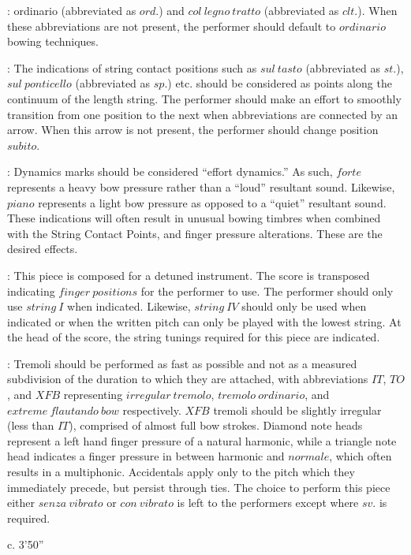 \documentclass[11pt]{article}
\newcommand*\circled[1]{\tikz[baseline=(char.base)]{
            \node[shape=circle,draw,inner sep=1pt] (char) {#1};}}
\begin{document}
\begingroup
\begin{center}
 : \circled{1} ordinario (abbreviated as $ord.$) and \circled{2} $col \ legno \ tratto$ (abbreviated as $clt.$). When these abbreviations are not present, the performer should default to $ordinario$ bowing techniques.
\rightskip\leftskip
\phantom{text} \hfill \phantom{()}

 : The indications of string contact positions such as $sul \ tasto$ (abbreviated as $st.$), $sul \ ponticello$ (abbreviated as $sp.$) etc. should be considered as points along the continuum of the length string. The performer should make an effort to smoothly transition from one position to the next when abbreviations are connected by an arrow. When this arrow is not present, the performer should change position $subito$.
\rightskip\leftskip
\phantom{text} \hfill \phantom{()}

 : Dynamics marks should be considered ``effort dynamics.'' As such, $forte$ represents a heavy bow pressure rather than a ``loud'' resultant sound. Likewise, $piano$ represents a light bow pressure as opposed to a ``quiet'' resultant sound. These indications will often result in unusual bowing timbres when combined with the String Contact Points, and finger pressure alterations. These are the desired effects.
\rightskip\leftskip
\phantom{text} \hfill \phantom{()}

 : This piece is composed for a detuned instrument. The score is transposed indicating $finger \ positions$ for the performer to use. The performer should only use $string \ I$ when indicated. Likewise, $string \ IV$ should only be used when indicated or when the written pitch can only be played with the lowest string. At the head of the score, the string tunings required for this piece are indicated. 
\rightskip\leftskip
\phantom{text} \hfill \phantom{()}

 : \circled{1} Tremoli should be performed as fast as possible and not as a measured subdivision of the duration to which they are attached, with abbreviations $IT$, $TO$, and $XFB$ representing $irregular \ tremolo$, $tremolo \ ordinario$, and $extreme \ flautando \ bow$ respectively. $XFB$ tremoli should be slightly irregular (less than $IT$), comprised of almost full bow strokes. \circled{2} Diamond note heads represent a left hand finger pressure of a natural harmonic, \circled{3} while a triangle note head indicates a finger pressure in between harmonic and $normale$, which often results in a multiphonic. \circled{4} Accidentals apply only to the pitch which they immediately precede, but persist through ties. \circled{5} The choice to perform this piece either $senza \ vibrato$ or $con \ vibrato$ is left to the performers except where $sv.$ is required.
\rightskip\leftskip
\phantom{text} \hfill \phantom{()}
\end{center}
\endgroup

\vspace*{17\baselineskip}

\begin{center}
c. 3'50''
\end{center}

\vspace*{27\baselineskip}
\end{document}
